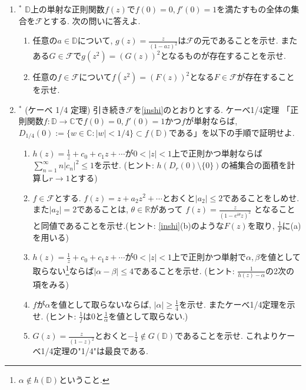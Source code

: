 \documentclass[dvipdfmx,a4paper,11pt]{article}
\newcommand{\R}{\mathbb{R}}
\newcommand{\C}{\mathbb{C}}
\newcommand{\D}{\mathbb{D}}
\theoremstyle{definition}
\begin{document}
\begin{enumerate}[label=\textbf{問}8.\arabic*]
\item  $^{*}$ \label{inshi} $\D$上の単射な正則関数$f(z)$で$f(0)=0, f'(0)=1$を満たすもの全体の集合を$\mathcal{F}$とする. 
次の問いに答えよ.
\vspace{-8pt}
   \begin{enumerate}
\setlength{\parskip}{0cm} 
  \setlength{\itemsep}{0cm} 
  \item 任意の$a \in \D$について, $g(z) = \frac{z}{(1 - az)^2}$は$\mathcal{F}$の元であることを示せ. またある$G \in \mathcal {F}$で$g(z^2) = (G(z))^2$となるものが存在することを示せ. 
  \item 任意の$f \in \mathcal{F}$について$f(z^2) = (F(z))^2$となる$F \in \mathcal{F}$が存在することを示せ. 
      \end{enumerate} 
      
 \item $^{*}$ (ケーべ 1/4 定理) 引き続き$\mathcal{F}$を\ref{inshi}のとおりとする. ケーべ1/4定理 「正則関数$f : \D \to \C$で$f(0)=0, f'(0)=1$かつ$f$が単射ならば, $D_{1/4}(0):=\{w \in \C : |w| <  1/4\} \subset f(\D)$である」を以下の手順で証明せよ.

   \begin{enumerate}
\setlength{\parskip}{0cm} 
  \setlength{\itemsep}{0cm} 
 \item $h(z) = \frac{1}{z} + c_0 + c_1 z + \cdots$が$0 < |z|<1$上で正則かつ単射ならば$\sum_{n=1}^{\infty}n|c_n|^2 \le 1$を示せ. (ヒント: $h(D_{r}(0) \setminus \{ 0\})$の補集合の面積を計算し$r \to 1$とする)
 \item $f\in \mathcal{F}$とする. $f(z) = z +a_2 z^2 + \cdots$とおくと$|a_2| \le 2$であることをしめせ.
 また$|a_2|=2$であることは, $\theta \in \R$があって
 $
 f(z) = \frac{z}{(1 - e^{i \theta}z)^2}
 $
 となることと同値であることを示せ.(ヒント: \ref{inshi}(b)のような$F(z)$を取り, $\frac{1}{F}$に(a)を用いる)
 \item $h(z) = \frac{1}{z} + c_0 + c_1 z + \cdots$が$0 < |z|<1$上で正則かつ単射で$\alpha,\beta$を値として取らない\footnote{$\alpha \not \in h(\D)$ということ.}ならば$|\alpha - \beta| \le 4$であることを示せ. (ヒント: $\frac{1}{h(z)-\alpha}$の2次の項をみる)
 \item $f$が$\alpha$を値として取らないならば, $|\alpha | \ge\frac{1}{4}$を示せ. またケーべ1/4定理を示せ. (ヒント: $\frac{1}{f}$は0と$\frac{1}{\alpha}$を値として取らない.)
\item  $G(z) = \frac{z}{(1 - z)^2}$とおくと$-\frac{1}{4} \not \in G(\D)$であることを示せ. これよりケーべ1/4定理の"1/4"は最良である.
  \end{enumerate} 
 

\end{enumerate}
\end{document}
